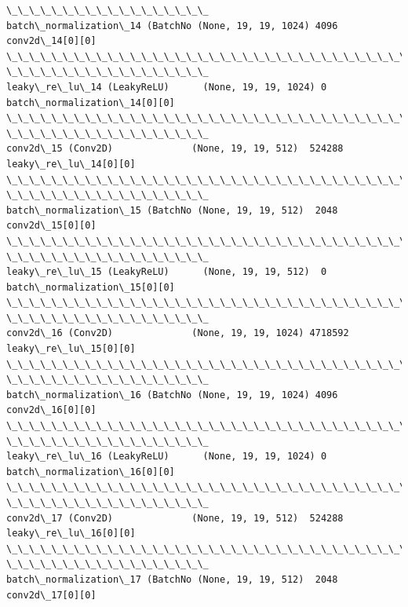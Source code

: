 \documentclass[11pt]{article}
\begin{document}
\begin{Verbatim}[commandchars=\\\{\}]
\_\_\_\_\_\_\_\_\_\_\_\_\_\_\_\_\_\_
batch\_normalization\_14 (BatchNo (None, 19, 19, 1024) 4096        conv2d\_14[0][0]
\_\_\_\_\_\_\_\_\_\_\_\_\_\_\_\_\_\_\_\_\_\_\_\_\_\_\_\_\_\_\_\_\_\_\_\_\_\_\_\_\_\_\_\_\_\_\_\_\_\_\_\_\_\_\_\_\_\_\_\_\_\_\_\_\_\_\_\_\_\_\_\_\_\_\_\_\_\_\_\_
\_\_\_\_\_\_\_\_\_\_\_\_\_\_\_\_\_\_
leaky\_re\_lu\_14 (LeakyReLU)      (None, 19, 19, 1024) 0
batch\_normalization\_14[0][0]
\_\_\_\_\_\_\_\_\_\_\_\_\_\_\_\_\_\_\_\_\_\_\_\_\_\_\_\_\_\_\_\_\_\_\_\_\_\_\_\_\_\_\_\_\_\_\_\_\_\_\_\_\_\_\_\_\_\_\_\_\_\_\_\_\_\_\_\_\_\_\_\_\_\_\_\_\_\_\_\_
\_\_\_\_\_\_\_\_\_\_\_\_\_\_\_\_\_\_
conv2d\_15 (Conv2D)              (None, 19, 19, 512)  524288
leaky\_re\_lu\_14[0][0]
\_\_\_\_\_\_\_\_\_\_\_\_\_\_\_\_\_\_\_\_\_\_\_\_\_\_\_\_\_\_\_\_\_\_\_\_\_\_\_\_\_\_\_\_\_\_\_\_\_\_\_\_\_\_\_\_\_\_\_\_\_\_\_\_\_\_\_\_\_\_\_\_\_\_\_\_\_\_\_\_
\_\_\_\_\_\_\_\_\_\_\_\_\_\_\_\_\_\_
batch\_normalization\_15 (BatchNo (None, 19, 19, 512)  2048        conv2d\_15[0][0]
\_\_\_\_\_\_\_\_\_\_\_\_\_\_\_\_\_\_\_\_\_\_\_\_\_\_\_\_\_\_\_\_\_\_\_\_\_\_\_\_\_\_\_\_\_\_\_\_\_\_\_\_\_\_\_\_\_\_\_\_\_\_\_\_\_\_\_\_\_\_\_\_\_\_\_\_\_\_\_\_
\_\_\_\_\_\_\_\_\_\_\_\_\_\_\_\_\_\_
leaky\_re\_lu\_15 (LeakyReLU)      (None, 19, 19, 512)  0
batch\_normalization\_15[0][0]
\_\_\_\_\_\_\_\_\_\_\_\_\_\_\_\_\_\_\_\_\_\_\_\_\_\_\_\_\_\_\_\_\_\_\_\_\_\_\_\_\_\_\_\_\_\_\_\_\_\_\_\_\_\_\_\_\_\_\_\_\_\_\_\_\_\_\_\_\_\_\_\_\_\_\_\_\_\_\_\_
\_\_\_\_\_\_\_\_\_\_\_\_\_\_\_\_\_\_
conv2d\_16 (Conv2D)              (None, 19, 19, 1024) 4718592
leaky\_re\_lu\_15[0][0]
\_\_\_\_\_\_\_\_\_\_\_\_\_\_\_\_\_\_\_\_\_\_\_\_\_\_\_\_\_\_\_\_\_\_\_\_\_\_\_\_\_\_\_\_\_\_\_\_\_\_\_\_\_\_\_\_\_\_\_\_\_\_\_\_\_\_\_\_\_\_\_\_\_\_\_\_\_\_\_\_
\_\_\_\_\_\_\_\_\_\_\_\_\_\_\_\_\_\_
batch\_normalization\_16 (BatchNo (None, 19, 19, 1024) 4096        conv2d\_16[0][0]
\_\_\_\_\_\_\_\_\_\_\_\_\_\_\_\_\_\_\_\_\_\_\_\_\_\_\_\_\_\_\_\_\_\_\_\_\_\_\_\_\_\_\_\_\_\_\_\_\_\_\_\_\_\_\_\_\_\_\_\_\_\_\_\_\_\_\_\_\_\_\_\_\_\_\_\_\_\_\_\_
\_\_\_\_\_\_\_\_\_\_\_\_\_\_\_\_\_\_
leaky\_re\_lu\_16 (LeakyReLU)      (None, 19, 19, 1024) 0
batch\_normalization\_16[0][0]
\_\_\_\_\_\_\_\_\_\_\_\_\_\_\_\_\_\_\_\_\_\_\_\_\_\_\_\_\_\_\_\_\_\_\_\_\_\_\_\_\_\_\_\_\_\_\_\_\_\_\_\_\_\_\_\_\_\_\_\_\_\_\_\_\_\_\_\_\_\_\_\_\_\_\_\_\_\_\_\_
\_\_\_\_\_\_\_\_\_\_\_\_\_\_\_\_\_\_
conv2d\_17 (Conv2D)              (None, 19, 19, 512)  524288
leaky\_re\_lu\_16[0][0]
\_\_\_\_\_\_\_\_\_\_\_\_\_\_\_\_\_\_\_\_\_\_\_\_\_\_\_\_\_\_\_\_\_\_\_\_\_\_\_\_\_\_\_\_\_\_\_\_\_\_\_\_\_\_\_\_\_\_\_\_\_\_\_\_\_\_\_\_\_\_\_\_\_\_\_\_\_\_\_\_
\_\_\_\_\_\_\_\_\_\_\_\_\_\_\_\_\_\_
batch\_normalization\_17 (BatchNo (None, 19, 19, 512)  2048        conv2d\_17[0][0]

\end{Verbatim}
\end{document}
